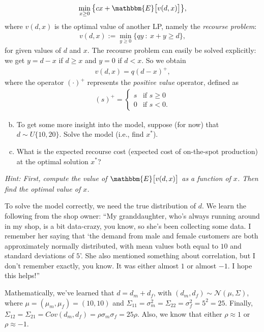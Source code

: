 \documentclass[assignments]{subfiles}
\begin{document}
\begin{exercise}
\begin{align}
    \min_{x \geq 0} \big\{ cx + \mathbbm{E}\big[v(d,x)\big] \big\},
\end{align}
where $v(d,x)$ is the optimal value of another LP, namely the \textit{recourse problem}:
\begin{align}
    v(d,x) := \min_{y \geq 0} \{ qy \ : \ x + y \geq d \},
\end{align}
for given values of $d$ and $x$. The recourse problem can easily be solved explicitly: we get $y=d-x$ if $d \geq x$ and $y=0$ if $d < x$. So we obtain
\begin{align}
    v(d,x) = q (d - x)^+,
\end{align}
where the operator $(\cdot)^+$ represents the \textit{positive value} operator, defined as
\begin{align}
    (s)^+ = \begin{cases}
    s &\text{if } s \geq 0\\
    0 &\text{if } s < 0.
    \end{cases}
\end{align}

\begin{enumerate}[(a)]
    \setcounter{enumi}{1}
    \item To get some more insight into the model, suppose (for now) that $d \sim U\{10, 20\}$. Solve the model (i.e., find $x^*$).
    \item What is the expected recourse cost (expected cost of on-the-spot production) at the optimal solution $x^*$?
\end{enumerate}

 \textit{Hint: First, compute the value of $\mathbbm{E}\big[v(d,x)\big]$ as a function of $x$. Then find the optimal value of $x$.}

To solve the model correctly, we need the true distribution of $d$. We learn the following from the shop owner: ``My granddaughter, who's always running around in my shop, is a bit data-crazy, you know, so she's been collecting some data. I remember her saying that `the demand from male and female customers are both approximately normally distributed, with mean values both equal to $10$ and standard deviations of $5$'. She also mentioned something about correlation, but I don't remember exactly, you know. It was either almost $1$ or almost $-1$. I hope this helps!''

Mathematically, we've learned that $d = d_m + d_f$, with $(d_m, d_f) \sim \mathcal{N}(\mu, \Sigma)$, where $\mu = (\mu_m, \mu_f) = (10,10)$ and $\Sigma_{11} = \sigma_m^2 = \Sigma_{22}  = \sigma_f^2 = 5^2 = 25$. Finally, $\Sigma_{12} = \Sigma_{21} = Cov(d_m, d_f) = \rho \sigma_m \sigma_f = 25 \rho$. Also, we know that either $\rho \approx 1$ or $\rho \approx -1$.


\end{exercise}
\end{document}
